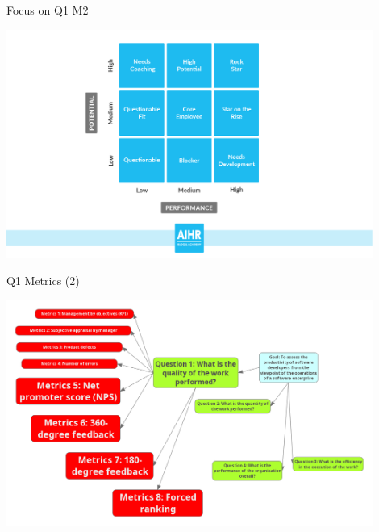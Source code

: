 \documentclass{beamer}
\begin{document}
\begin{frame}{\centerline{Focus on Q1 M2}}

\begin{center}
\includegraphics[width=120mm]{A2022.ScaleDeiDati/20180904_CaseStudy_GoalQuestions_M1_SubjectiveApprisalByManager.png}
\newline
\end{center}

\end{frame}

\begin{frame}{\centerline{Q1 Metrics (2)}}

\begin{center}
\includegraphics[width=120mm]{A2022.ScaleDeiDati/20180904_CaseStudy_GoalQuestions_M2.png}
\newline
\end{center}

\end{frame}
\end{document}
